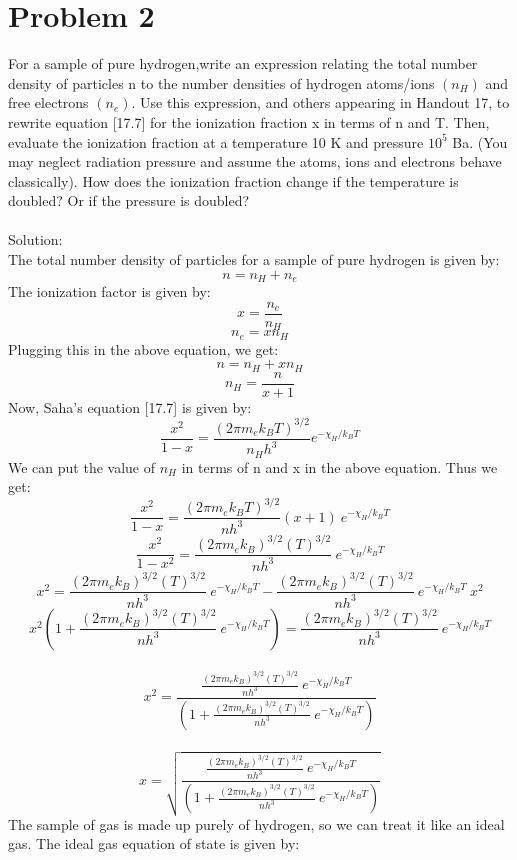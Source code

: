 \documentclass[10pt]{article}
\begin{document}
\section*{Problem 2}
For a sample of pure hydrogen,write an expression relating the total number density of particles n to the number densities of hydrogen atoms/ions $(n_{H})$ and free electrons $(n_{e})$. Use this expression, and others appearing in Handout 17, to rewrite equation [17.7] for the ionization fraction x in terms of n and T. Then, evaluate the ionization fraction at a temperature 10 K and pressure $10^{5}$ Ba. (You may neglect radiation pressure and assume the atoms, ions and electrons behave classically). How does the ionization fraction change if the temperature is doubled? Or if the pressure is doubled?\\ \\
Solution:\\
The total number density of particles for a sample of pure hydrogen is given by:
\[ n = n_{H} + n_{e} \]
The ionization factor is given by:
\[ x = \frac{n_{e}}{n_{H}}\]
\[ n_{e} = x n_{H}\]
Plugging this in the above equation, we get:
\[ n = n_{H} + xn_{H}\]
\[ n_{H} = \frac{n}{x+1}\]
Now, Saha's equation [17.7] is given by:
\[ \frac{x^2}{1-x} = \frac{(2\pi m_{e} k_{B} T)^{3/2}}{n_{H} h^3} e^{-\chi_{H}/k_{B}T}\]
We can put the value of $n_{H}$ in terms of n and x in the above equation. Thus we get:
\[ \frac{x^2}{1-x} = \frac{(2\pi m_{e} k_{B} T)^{3/2}}{n h^3} (x+1) \ e^{-\chi_{H}/k_{B}T}\]
\[ \frac{x^2}{1-x^2} = \frac{(2\pi m_{e} k_{B})^{3/2} (T)^{3/2}}{n h^3} \ e^{-\chi_{H}/k_{B}T}\]
\[ x^2 = \frac{(2\pi m_{e} k_{B})^{3/2} (T)^{3/2}}{n h^3} \ e^{-\chi_{H}/k_{B}T} - \frac{(2\pi m_{e} k_{B})^{3/2} (T)^{3/2}}{n h^3} \ e^{-\chi_{H}/k_{B}T} \ x^2\]
\[ x^2(1 + \frac{(2\pi m_{e} k_{B})^{3/2} (T)^{3/2}}{n h^3} \ e^{-\chi_{H}/k_{B}T}) = \frac{(2\pi m_{e} k_{B})^{3/2} (T)^{3/2}}{n h^3} \ e^{-\chi_{H}/k_{B}T} \]\\
\[ x^2 = \frac{\frac{(2\pi m_{e} k_{B})^{3/2} (T)^{3/2}}{n h^3} \ e^{-\chi_{H}/k_{B}T}}{(1 + \frac{(2\pi m_{e} k_{B})^{3/2} (T)^{3/2}}{n h^3} \ e^{-\chi_{H}/k_{B}T})}\]\\
\begin{equation}
    x = \sqrt{\frac{\frac{(2\pi m_{e} k_{B})^{3/2} (T)^{3/2}}{n h^3} \ e^{-\chi_{H}/k_{B}T}}{(1 + \frac{(2\pi m_{e} k_{B})^{3/2} (T)^{3/2}}{n h^3} \ e^{-\chi_{H}/k_{B}T})}}  \tag{1}
\end{equation}
The sample of gas is made up purely of hydrogen, so we can treat it like an ideal gas. The ideal gas equation of state is given by:
\end{document}

